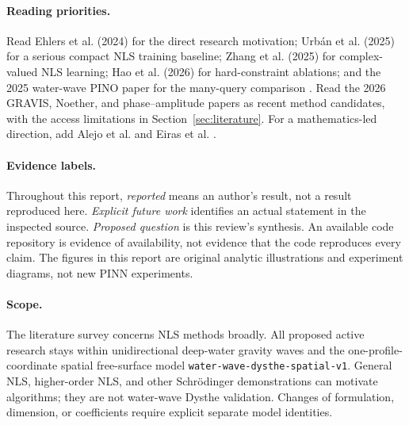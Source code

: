 \paragraph{Reading priorities.}
Read Ehlers et al. (2024) for the direct research motivation;
Urb\'an et al. (2025) for a serious compact NLS training baseline;
Zhang et al. (2025) for complex-valued NLS learning;
Hao et al. (2026) for hard-constraint ablations;
and the 2025 water-wave PINO paper for the many-query comparison
\cite{ehlers2024,urban,cvpinn,hardic,wavepino}.
Read the 2026 GRAVIS, Noether, and phase--amplitude papers as recent
method candidates, with the access limitations in Section~\ref{sec:literature}.
For a mathematics-led direction, add Alejo et al. and Eiras et al.
\cite{alejo,eiras}.

\paragraph{Evidence labels.}
Throughout this report, \emph{reported} means an author's result, not a result
reproduced here. \emph{Explicit future work} identifies an actual statement
in the inspected source. \emph{Proposed question} is this review's synthesis.
An available code repository is evidence of availability, not evidence that
the code reproduces every claim. The figures in this report are original
analytic illustrations and experiment diagrams, not new PINN experiments.

\paragraph{Scope.}
The literature survey concerns NLS methods broadly. All proposed active
research stays within unidirectional deep-water gravity waves and the
one-profile-coordinate spatial free-surface model
\texttt{water-wave-dysthe-spatial-v1}. General NLS, higher-order NLS, and
other Schr\"odinger demonstrations can motivate algorithms; they are not
water-wave Dysthe validation. Changes of formulation, dimension, or
coefficients require explicit separate model identities.
